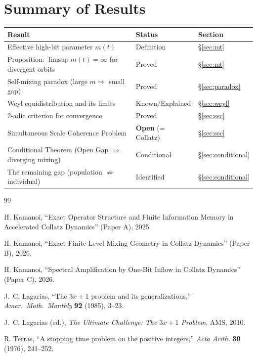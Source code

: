 \documentclass[12pt]{article}
\theoremstyle{definition}
\begin{document}
\section{Summary of Results}

\begin{center}
\begin{tabular}{@{}lll@{}}
\toprule
Result & Status & Section \\
\midrule
Effective high-bit parameter $m(t)$ & Definition & \S\ref{sec:mt} \\
Proposition: $\limsup m(t) = \infty$ for divergent orbits & Proved & \S\ref{sec:mt} \\
Self-mixing paradox (large $m \Rightarrow$ small gap) & Proved & \S\ref{sec:paradox} \\
Weyl equidistribution and its limits & Known/Explained & \S\ref{sec:weyl} \\
2-adic criterion for convergence & Proved & \S\ref{sec:ssc} \\
Simultaneous Scale Coherence Problem & \textbf{Open} (= Collatz) & \S\ref{sec:ssc} \\
Conditional Theorem (Open Gap $\Rightarrow$ diverging mixing) & Conditional & \S\ref{sec:conditional} \\
The remaining gap (population $\not\Rightarrow$ individual) & Identified & \S\ref{sec:conditional} \\
\bottomrule
\end{tabular}
\end{center}

\begin{thebibliography}{99}

H. Kamanoi,
``Exact Operator Structure and Finite Information Memory in Accelerated Collatz Dynamics'' (Paper A), 2025.

H. Kamanoi,
``Exact Finite-Level Mixing Geometry in Collatz Dynamics'' (Paper B), 2026.

H. Kamanoi,
``Spectral Amplification by One-Bit Inflow in Collatz Dynamics'' (Paper C), 2026.

J.~C. Lagarias, ``The $3x+1$ problem and its generalizations,''
\textit{Amer.\ Math.\ Monthly} \textbf{92} (1985), 3--23.

J.~C. Lagarias (ed.), \textit{The Ultimate Challenge: The $3x+1$ Problem}, AMS, 2010.

R. Terras, ``A stopping time problem on the positive integers,''
\textit{Acta Arith.} \textbf{30} (1976), 241--252.

\end{thebibliography}
\end{document}
